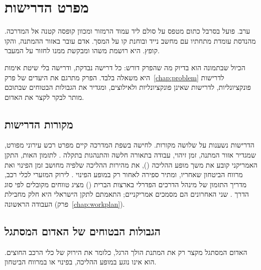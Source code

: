\chapter{מפרט הדרישות}\label{chap:requirements}
\begin{scenebox}
ערב. פועל בסרבל כתום מטפס על סולם ליד עמוד הרמזור ומכוון קופסה קטנה אל המדרכה.
מהנדסת עומדת מתחתיו עם מחשב נייד ובוחנת קו על המסך. אדם עובר באזור ההמתנה, והקו קופץ.
היא רושמת משהו ומבקשת ממנו לחזור על המעבר.
\end{scenebox}

הכיול שבתמונה הוא בדיוק מה שהפרק דורש: כל דרישה נבדקת, ודרישה בלי שיטת אימות היא משאלה בלבד.
הפרק מתרגם את היעדים של פרק~\ref{chap:problem} לדרישות פונקציונליות, לדרישות שאינן פונקציונליות ולאילוצים, ומגדיר את הגבולות הבטוחים שבתוכם מותר לבקר לקצר את האדום.

\section{מקורות הדרישות}
הדרישות נשענות על שלושה מקורות.
לחישה בשפת המדרכה קיים מפרט רכש עירוני מפורט, שמגדיר אזור המתנה, זמן זיהוי, עבודה בתאורה חלשה והתנהגות בתקלה \cite{tfl2015kerbside}.
לתזמון האות, התקן האמריקני קובע את משך מופע ההליכה (), את מהירות ההליכה שלפיה מחושב זמן הפינוי ואת מרווח הביטחון שאחריו, ומתיר ספירה לאחור רק במופע הפינוי \cite{fhwa2025mutcd}.
לירוק המזערי לכלי רכב, מדריך התזמון של מינהל הדרכים הפדרלי בארצות הברית () מציג טווחים מקובלים לפי סוג הדרך \cite{fhwa2008stm}.
שני האחרונים הם מסמכים אמריקניים; התאמתם לתקן הישראלי היא חלק מחבילת העבודה הראשונה (פרק~\ref{chap:workplan}).

\section{הגבולות הבטוחים של האדום המסתגל}
האדום המסתגל מקצר רק את המתנת הולך הרגל, כלומר את הירוק של כלי הרכב החוצים. הוא אינו נוגע במופע ההליכה, בפינוי או במרווח הביטחון.

